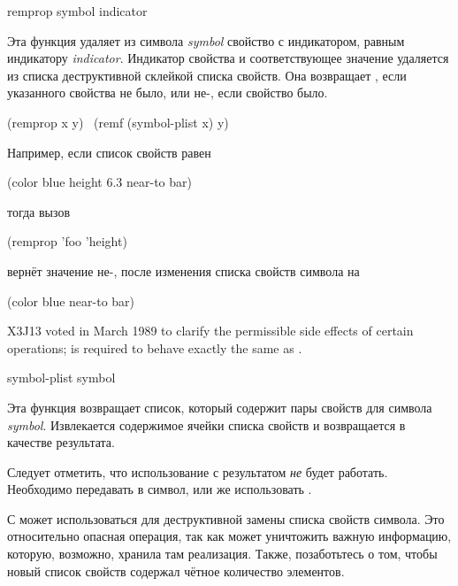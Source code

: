 \begin{defun}[Функция]
remprop symbol indicator

Эта функция удаляет из символа \emph{symbol} свойство с индикатором, равным
 индикатору \emph{indicator}. Индикатор свойства и соответствующее
значение удаляется из списка деструктивной склейкой списка свойств. Она
возвращает {\false}, если указанного свойства не было, или не-{\false}, если
свойство было.
\begin{lisp}
(remprop x y) \EQ\ (remf (symbol-plist x) y)
\end{lisp}
Например, если список свойств  равен
\begin{lisp}
(color blue height 6.3 near-to bar)
\end{lisp}
тогда вызов
\begin{lisp}
(remprop 'foo 'height)
\end{lisp}
вернёт значение не-{\nil}, после изменения списка свойств символа  на
\begin{lisp}
(color blue near-to bar)
\end{lisp}
\begin{newer}
X3J13 voted in March 1989 
to clarify the permissible side effects of certain operations;
is required to behave exactly the same as
.
\end{newer}
\end{defun}

\begin{defun}[Функция]
symbol-plist symbol

Эта функция возвращает список, который содержит пары свойств для символа
\emph{symbol}. Извлекается содержимое ячейки списка свойств и возвращается в
качестве результата.

Следует отметить, что использование  с результатом 
\emph{не} будет работать. Необходимо передавать в  символ, или же
использовать .

С  может использоваться  для деструктивной замены
списка свойств символа. Это относительно опасная операция, так как может
уничтожить важную информацию, которую, возможно, хранила там реализация.
Также, позаботьтесь о том, чтобы новый список свойств содержал чётное количество
элементов.
\end{defun}

